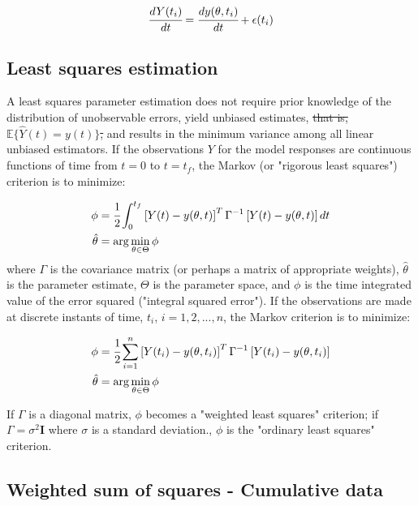 \documentclass[a4paper,fleqn]{cas-dc}
\begin{document}
{\footnotesize
\begin{equation}
	\cfrac{d Y(t_i)}{dt} = \cfrac{dy(\theta, t_i)}{dt} + \epsilon(t_i)
\end{equation} }

\subsection{Least squares estimation}
A least squares parameter estimation does not require prior knowledge of the distribution of unobservable errors, yield  unbiased estimates, \sout{that is, $ \mathbb{E}\{\hat{Y}(t) = y(t) \} $,} and results in the minimum variance among all linear unbiased estimators. If the observations $ Y$ for the model responses are continuous functions of time from $t = 0$ to $t = t_f$, the Markov (or "rigorous least squares") criterion is to minimize:

{\footnotesize
\begin{align}
	\phi &= \cfrac{1}{2} \int_{0}^{t_f}  \left[ Y(t) - y(\theta,t) \right]^T \Gamma^{-1} \left[ Y(t) - y(\theta,t) \right] dt \\
	\hat{\theta} &= \arg \min_{\theta \in \Theta} \phi
\end{align} }
where $\Gamma$ is the covariance matrix (or perhaps a matrix of appropriate weights), $\hat{\theta}$ is the parameter estimate, $\Theta$ is the parameter space, and $\phi$ is the time integrated value of the error squared ("integral squared error"). 
If the observations are made at discrete instants of time, $t_i$, $i = 1,2,...,n$, the Markov criterion is to minimize:

{\footnotesize
\begin{align}
	\phi &= \cfrac{1}{2} \sum_{i=1}^{n} \left[ Y(t_i) - y(\theta,t_i) \right]^T \Gamma^{-1} \left[ Y(t_i) - y(\theta,t_i) \right] \\
	\hat{\theta} &= \arg \min_{\theta \in \Theta} \phi
\end{align} }

If $\Gamma$ is a diagonal matrix, $\phi$  becomes a "weighted least squares" criterion; if $\Gamma = \sigma^2 \textbf{I}$ where $\sigma$ is a standard deviation., $\phi$ is the "ordinary least squares" criterion.

\subsection{Weighted sum of squares - Cumulative data}
\end{document}
